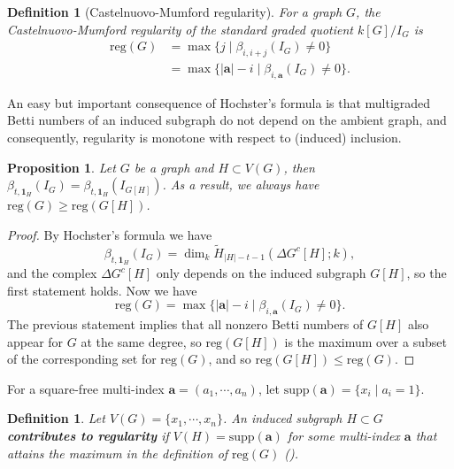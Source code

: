 \documentclass[dvipsnames,10pt]{article}
\newcommand{\reg}{\mathrm{reg}}
\newtheorem{proposition}[theorem]{Proposition}
\newtheorem{defi}[theorem]{Definition}
\newcommand{\gb}[1]{{\color{red} \textup{(\!(GB: #1)\!)}}}
\begin{document}
\begin{defi}[Castelnuovo-Mumford regularity]
    For a graph $G$, the Castelnuovo-Mumford regularity of the standard graded quotient $k[G]/I_G$ is
    \begin{align*}
    \mathrm{reg}(G)&=\max\{j\mid\beta_{i,i+j}(I_G)\neq 0\}\\
    &= \max\{|\mathbf{a}|-i\mid\beta_{i,\mathbf{a}}(I_G)\neq0\}.
    \end{align*}
\end{defi}

An easy but important consequence of Hochster's formula is that multigraded Betti numbers of an induced subgraph do not depend on the ambient graph, and consequently, regularity is monotone with respect to (induced) inclusion.

\begin{proposition}
    Let $G$ be a graph and $H\subset V(G)$, then $\beta_{t,\mathbf{1}_H}(I_G) = \beta_{t,\mathbf{1}_H}(I_{G[H]})$. As a result, we always have $\reg(G)\geqslant \reg(G[H])$.
\end{proposition}

\begin{proof}
    By Hochster's formula we have
    \begin{equation*}
        \beta_{t,\mathbf{1}_H}(I_G) = \dim_k \tilde{H}_{|H|-t-1}(\Delta G^c[H];k),
    \end{equation*}
    and the complex $\Delta G^c[H]$ only depends on the induced subgraph $G[H]$, so the first statement holds. Now we have
    \begin{equation*}
        \reg(G) =\max\{|\mathbf{a}|-i \mid \beta_{i,\mathbf{a}}(I_G)\neq 0\}.
    \end{equation*}
    The previous statement implies that all nonzero Betti numbers of $G[H]$ also appear for $G$ at the same degree, so $\reg(G[H])$ is the maximum over a subset of the corresponding set for $\reg(G)$, and so $\reg(G[H])\leqslant \reg(G)$.
\end{proof}

For a square-free multi-index $\mathbf{a}=(a_1,\cdots,a_n)$, let $\mathrm{supp}(\mathbf{a})=\{x_i\mid a_i=1\}$.
\begin{defi}
    Let $V(G)=\{x_1,\cdots,x_n\}$. An induced subgraph $H\subset G$ \textbf{contributes to regularity} if $V(H)= \mathrm{supp}(\mathbf{a})$ for some multi-index $\mathbf{a}$ that attains the maximum in the definition of $\mathrm{reg}(G)$ ().
\end{defi}
\end{document}
